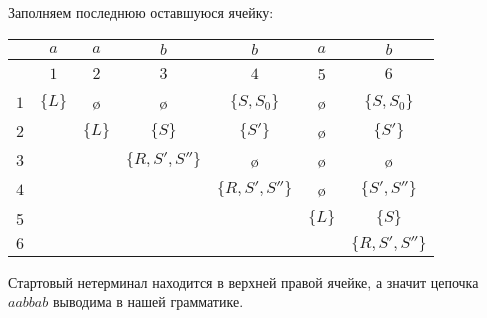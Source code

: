 \begin{example}
Заполняем последнюю оставшуюся ячейку:

\begin{center}
  \begin{tabular}{c||cc|cc|cc}
    & $a$ & $a$ & $b$ & $b$ & $a$ & $b$ \\ \hline
    & $1$ & $2$ & $3$ & $4$ & 5 & $6$ \\ \hline \hline
  $1$ & $\{L\}$ & \o & \o & $\{S, S_0\}$ & \o & $\{S, S_0\}$ \\ 
  $2$ &   & $\{L\}$ & $\{S\}$ & $\{S'\}$ & \o & $\{S'\}$ \\ \hline
  $3$ &   &   & $\{R, S', S''\}$ & \o & \o & \o \\ 
  $4$ &   &   &   & $\{R, S', S''\}$ & \o & $\{S', S''\}$ \\ \hline
  5 &   &   &   &   & $\{L\}$ & $\{S\}$ \\ 
  $6$ &   &   &   &   &   & $\{R, S', S''\}$
  \end{tabular}
\end{center}

Стартовый нетерминал находится в верхней правой ячейке, а значит цепочка $a a b b a b$ выводима в нашей грамматике.

\end{example}

